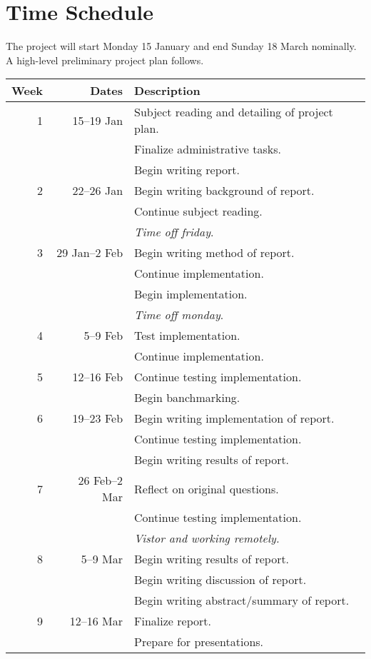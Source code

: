 \documentclass[a4paper, parskip]{scrartcl}
\begin{document}
\section{Time Schedule}
\label{sec:time_schedule}

The project will start Monday 15 January and end Sunday 18 March nominally. A
high-level preliminary project plan follows.

\begin{center}
  \begin{tabular}{rrl}
    \toprule
    \midrule
    \textbf{Week} & \textbf{Dates} & \textbf{Description} \\
    \midrule
    1 & 15--19 Jan & Subject reading and detailing of project plan. \\
    & & Finalize administrative tasks. \\
    & & Begin writing report. \\
    \midrule
    2 & 22--26 Jan & Begin writing background of report. \\
    & & Continue subject reading. \\
    & & \emph{Time off friday}. \\
    \midrule
    3 & 29 Jan--2 Feb & Begin writing method of report. \\
    & & Continue implementation. \\
    & & Begin implementation. \\
    & & \emph{Time off monday}. \\
    \midrule
    4 & 5--9 Feb & Test implementation. \\
    & & Continue implementation. \\
    \midrule
    5 & 12--16 Feb & Continue testing implementation. \\
    & & Begin banchmarking. \\
    \midrule
    6 & 19--23 Feb & Begin writing implementation of report. \\
     &  & Continue testing implementation. \\
    & & Begin writing results of report. \\
    \midrule
    7 & 26 Feb--2 Mar & Reflect on original questions. \\
    & & Continue testing implementation. \\
    & & \emph{Vistor and working remotely.} \\
    \midrule
    8 & 5--9 Mar & Begin writing results of report. \\
    & & Begin writing discussion of report. \\
    & & Begin writing abstract/summary of report. \\
    \midrule
    9 & 12--16 Mar & Finalize report. \\
    & & Prepare for presentations. \\
    \midrule
    \bottomrule
  \end{tabular}
\end{center}
\end{document}

